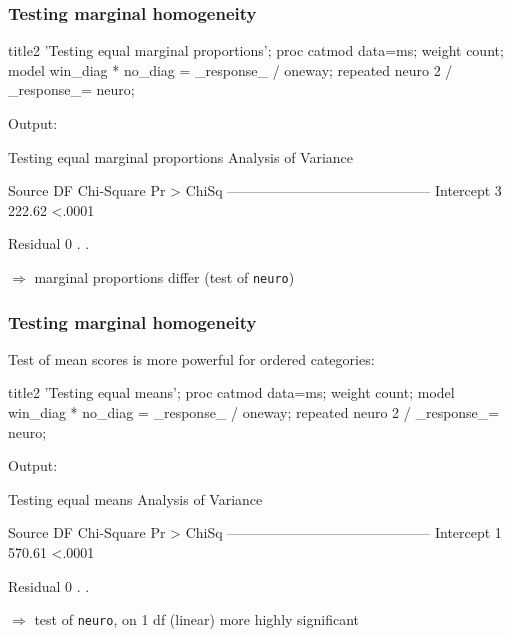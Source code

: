 \begin{frame}[fragile]
  \frametitle{Testing marginal homogeneity}
\begin{Input}[fontsize=\footnotesize,label=\fbox{$\cdots$ \texttt{agreemar.sas} $\cdots$},baselinestretch=0.8,firstnumber=20]
title2 'Testing equal marginal proportions';
proc catmod data=ms;
   weight count;
   model win_diag * no_diag = _response_ / oneway;
   repeated neuro 2 / _response_= neuro;
\end{Input}
Output:
\begin{Output}[gobble=5,baselinestretch=0.9]
                 Testing equal marginal proportions
                        Analysis of Variance
 
            Source         DF   Chi-Square    Pr > ChiSq
            --------------------------------------------
            Intercept       3       222.62        <.0001

            Residual        0          .           .    
\end{Output}
$\Rightarrow$ marginal proportions differ (test of \texttt{neuro})

\end{frame}

\begin{frame}[fragile]
  \frametitle{Testing marginal homogeneity}
Test of mean scores is more powerful for ordered categories:
\begin{Input}[fontsize=\footnotesize,label=\fbox{$\cdots$ \texttt{agreemar.sas}},baselinestretch=0.8,firstnumber=26]
title2 'Testing equal means';
proc catmod data=ms;
   weight count;
   model win_diag * no_diag = _response_ / oneway;
   repeated neuro 2 / _response_= neuro;
\end{Input}
Output:
\begin{Output}[gobble=5,baselinestretch=0.9]
                        Testing equal means
                        Analysis of Variance
 
            Source         DF   Chi-Square    Pr > ChiSq
            --------------------------------------------
            Intercept       1       570.61        <.0001

            Residual        0          .           .    
\end{Output}
$\Rightarrow$ test of \texttt{neuro}, on 1 df (linear) more highly significant

\end{frame}

